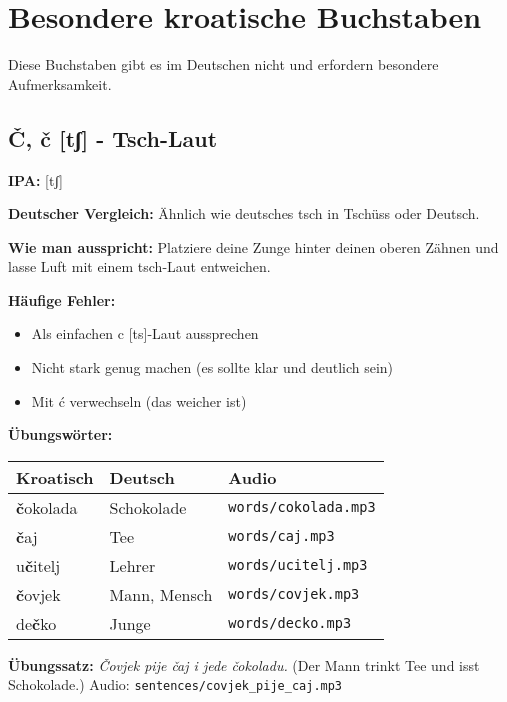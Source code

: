 \section{Besondere kroatische Buchstaben}

Diese Buchstaben gibt es im Deutschen nicht und erfordern besondere Aufmerksamkeit.

\subsection{Č, č [tʃ] - \glqq Tsch-Laut\grqq{}}

\begin{tcolorbox}[colback=lightblue!30, colframe=croatianblue, title=\textbf{Č, č}]

\textbf{IPA:} [tʃ]

\textbf{Deutscher Vergleich:}
Ähnlich wie deutsches \glqq tsch\grqq{} in \glqq Tschüss\grqq{} oder \glqq Deutsch\grqq{}.

\textbf{Wie man ausspricht:}
Platziere deine Zunge hinter deinen oberen Zähnen und lasse Luft mit einem \glqq tsch\grqq{}-Laut entweichen.

\textbf{Häufige Fehler:}
\begin{itemize}
    \item Als einfachen \glqq c\grqq{} [ts]-Laut aussprechen
    \item Nicht stark genug machen (es sollte klar und deutlich sein)
    \item Mit \glqq ć\grqq{} verwechseln (das weicher ist)
\end{itemize}

\textbf{Übungswörter:}
\begin{tabular}{lll}
\textbf{Kroatisch} & \textbf{Deutsch} & \textbf{Audio} \\
\midrule
\textbf{č}okolada & Schokolade & \texttt{words/cokolada.mp3} \\
\textbf{č}aj & Tee & \texttt{words/caj.mp3} \\
u\textbf{č}itelj & Lehrer & \texttt{words/ucitelj.mp3} \\
\textbf{č}ovjek & Mann, Mensch & \texttt{words/covjek.mp3} \\
de\textbf{č}ko & Junge & \texttt{words/decko.mp3} \\
\end{tabular}

\textbf{Übungssatz:}
\textit{Čovjek pije čaj i jede čokoladu.}
(Der Mann trinkt Tee und isst Schokolade.)
Audio: \texttt{sentences/covjek\_pije\_caj.mp3}

\end{tcolorbox}

